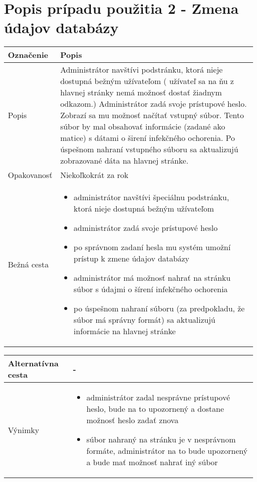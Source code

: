 \documentclass[12pt,a4paper]{report}
\begin{document}
\section[Popis prípadu použitia 2 - Zmena údajov databázy]{\rmfamily\bfseries
	Popis prípadu použitia 2 - Zmena údajov databázy}
\begin{table}[h!]
	\centering
	\begin{tabular}{|>{\centering\arraybackslash}m{3in}|>{\centering\arraybackslash}m{3in}|}
		\hline
		\centering Označenie & Popis \\ [0ex]
		\hline
		Popis & Administrátor navštívi podstránku, ktorá nieje dostupná bežným užívateľom (
		užívateľ sa na ňu z hlavnej stránky nemá možnosť dostať žiadnym odkazom.) Administrátor
		zadá svoje prístupové heslo. Zobrazí sa mu možnosť načítať vstupný súbor. Tento
		súbor by mal obsahovať informácie (zadané ako matice) s dátami o širení infekčného
		ochorenia. Po úspešnom nahraní vstupného súboru sa aktualizujú zobrazované
		dáta na hlavnej stránke.\\ [0ex]
		\hline
		Opakovanosť & Niekoľkokrát za rok \\ [0ex]
		\hline
		Bežná cesta & 	\begin{itemize}
							\item administrátor navštívi špeciálnu podstránku, ktorá nieje dostupná bežným užívateľom
							\item administrátor zadá svoje prístupové heslo
							\item po správnom zadaní hesla mu systém umožní prístup k zmene údajov databázy
							\item administrátor má možnosť nahrať na stránku súbor s údajmi o šírení infekčného ochorenia
							\item po úspešnom nahraní súboru (za predpokladu, že súbor má správny formát) sa aktualizujú informácie na hlavnej stránke
						\end{itemize} \\ [0ex]
					\hline
	\end{tabular}
\end{table}
\begin{table}[h!]
	\centering
	\begin{tabular}{|>{\centering\arraybackslash}m{3in}|>{\centering\arraybackslash}m{3in}|}
		\hline
		Alternatívna cesta & - \\ [0ex]
		\hline
		Výnimky &\begin{itemize}
						\item administrátor zadal nesprávne prístupové heslo, bude na to upozornený a dostane možnosť heslo zadať znova
						\item súbor nahraný na stránku je v nesprávnom formáte, administrátor na to bude upozornený a bude mať možnosť nahrať iný súbor
					\end{itemize} \\ [0ex]
		\hline
	\end{tabular}
\end{table}
\end{document}
